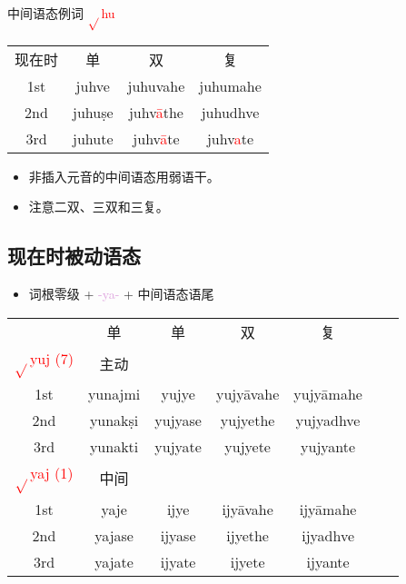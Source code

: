 \documentclass[17pt]{beamer}
\newcommand{\verbroot}[1]{\textcolor{red}{$\sqrt{}$#1}}
\newcommand{\fullpada}[1]{\textcolor{OliveGreen}{#1}}
\newcommand{\pratyaya}[1]{\textcolor{Plum}{#1}}
\newcommand{\veryimportant}[1]{\textcolor{red}{#1}}
\begin{document}
\begin{frame}{中间语态例词 \verbroot{hu}}
  %\small
  \centering
  \begin{tabular}{@{}cccc@{}} %
    现在时 & 单 & 双 & 复  \\
    1st & \fullpada{juhve} & \fullpada{juhuvahe}  & \fullpada{juhumahe}  \\
    2nd & \fullpada{juhuṣe} & \fullpada{juhv\veryimportant{ā}the} & \fullpada{juhudhve}   \\
    3rd & \fullpada{juhute} & \fullpada{juhv\veryimportant{ā}te} & \fullpada{juhv\veryimportant{a}te}  \\
  \end{tabular}
  \begin{itemize}
      \item 非插入元音的中间语态用弱语干。
      \item 注意二双、三双和三复。
  \end{itemize}  
\end{frame}

\subsection{现在时被动语态}
\begin{frame}{\insertsubsection}
  \begin{itemize}
    \item
      词根零级 + \pratyaya{\nobreakdash-ya\nobreakdash-} + 中间语态语尾   
  \end{itemize}
  \small
  \centering
  \begin{NiceTabular}{@{}ccccccc@{}} %
     & 单 & 单 & 双 & 复 \\
    \verbroot{yuj (7)} & 主动 &  \\
    1st & \fullpada{yunajmi}  & \fullpada{yujye} & \fullpada{yujyāvahe}  & \fullpada{yujyāmahe}  \\
    2nd & \fullpada{yunakṣi}  & \fullpada{yujyase} & \fullpada{yujyethe} & \fullpada{yujyadhve}   \\
    3rd & \fullpada{yunakti}  & \fullpada{yujyate} & \fullpada{yujyete} & \fullpada{yujyante}  \\
    \verbroot{yaj (1)} & 中间 &  \\
    1st & \fullpada{yaje}  & \fullpada{ijye} & \fullpada{ijyāvahe}  & \fullpada{ijyāmahe}  \\
    2nd & \fullpada{yajase}  & \fullpada{ijyase} & \fullpada{ijyethe} & \fullpada{ijyadhve}   \\
    3rd & \fullpada{yajate}  & \fullpada{ijyate} & \fullpada{ijyete} & \fullpada{ijyante}  \\
  \end{NiceTabular}
\end{frame}
\end{document}
